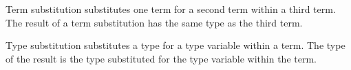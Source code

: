 Term substitution substitutes one term for a second term within a third term.  The result of a term substitution has the same type as the third term.



Type substitution substitutes a type for a type variable within a term.  The type of the result is the type substituted for the type variable within the term.



